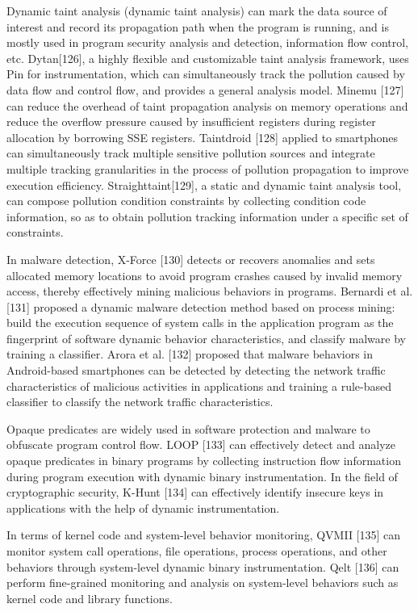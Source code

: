 Dynamic taint analysis (dynamic taint analysis) can mark the data source of interest and record its propagation path when the program is running, and is mostly used in program security analysis and detection, information flow control, etc.
Dytan[126], a highly flexible and customizable taint analysis framework, uses Pin for instrumentation, which can simultaneously track the pollution caused by data flow and control flow, and provides a general analysis model.
Minemu [127] can reduce the overhead of taint propagation analysis on memory operations and reduce the overflow pressure caused by insufficient registers during register allocation by borrowing SSE registers.
Taintdroid [128] applied to smartphones can simultaneously track multiple sensitive pollution sources and integrate multiple tracking granularities in the process of pollution propagation to improve execution efficiency.
Straighttaint[129], a static and dynamic taint analysis tool, can compose pollution condition constraints by collecting condition code information, so as to obtain pollution tracking information under a specific set of constraints.

In malware detection, X-Force [130] detects or recovers anomalies and sets allocated memory locations to avoid program crashes caused by invalid memory access, thereby effectively mining malicious behaviors in programs.
Bernardi et al. [131] proposed a dynamic malware detection method based on process mining: build the execution sequence of system calls in the application program as the fingerprint of software dynamic behavior characteristics, and classify malware by training a classifier.
Arora et al. [132] proposed that malware behaviors in Android-based smartphones can be detected by detecting the network traffic characteristics of malicious activities in applications and training a rule-based classifier to classify the network traffic characteristics.

Opaque predicates are widely used in software protection and malware to obfuscate program control flow.
LOOP [133] can effectively detect and analyze opaque predicates in binary programs by collecting instruction flow information during program execution with dynamic binary instrumentation.
In the field of cryptographic security, K-Hunt [134] can effectively identify insecure keys in applications with the help of dynamic instrumentation.

In terms of kernel code and system-level behavior monitoring, QVMII [135] can monitor system call operations, file operations, process operations, and other behaviors through system-level dynamic binary instrumentation.
Qelt [136] can perform fine-grained monitoring and analysis on system-level behaviors such as kernel code and library functions.
